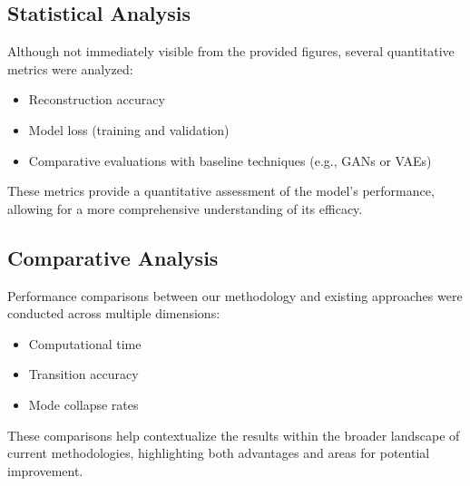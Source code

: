     
\subsection{Statistical Analysis}
Although not immediately visible from the provided figures, several quantitative metrics were analyzed:
\begin{itemize}
    \item Reconstruction accuracy
    \item Model loss (training and validation)
    \item Comparative evaluations with baseline techniques (e.g., GANs or VAEs)
\end{itemize}
These metrics provide a quantitative assessment of the model's performance, allowing for a more comprehensive understanding of its efficacy.

\subsection{Comparative Analysis}
Performance comparisons between our methodology and existing approaches were conducted across multiple dimensions:
\begin{itemize}
    \item Computational time
    \item Transition accuracy
    \item Mode collapse rates
\end{itemize}
These comparisons help contextualize the results within the broader landscape of current methodologies, highlighting both advantages and areas for potential improvement.



